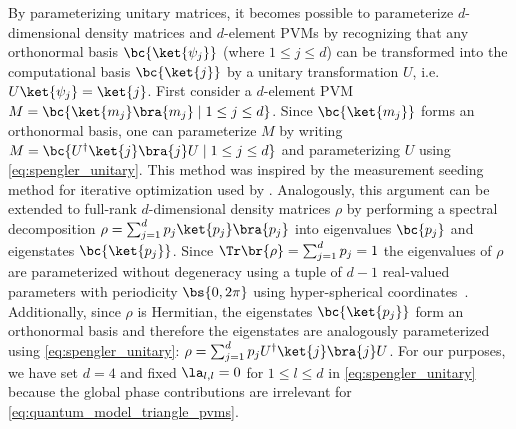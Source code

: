 \documentclass[aps, 10pt, english, twoside, pra, nofootinbib, tightenlines, longbibliography, superscriptaddress]{revtex4-1}
\begin{document}
    By parameterizing unitary matrices, it becomes possible to parameterize $d$-dimensional density matrices and $d$-element PVMs by recognizing that any orthonormal basis $\bc{\ket{\psi_j}}$ (where $1 \leq j \leq d$) can be transformed into the computational basis $\bc{\ket{j}}$ by a unitary transformation $U$, i.e. $U \ket{\psi_j} = \ket{j}$. First consider a $d$-element PVM $M = \bc{\ket{m_j}\bra{m_j} \mid 1 \leq j \leq d}$. Since $\bc{\ket{m_j}}$ forms an orthonormal basis, one can parameterize $M$ by writing $M = \bc{U^{\dagger}\ket{j}\bra{j}U \mid 1 \leq j \leq d}$ and parameterizing $U$ using \cref{eq:spengler_unitary}. This method was inspired by the measurement seeding method for iterative optimization used by \citet{Pal_2010}. Analogously, this argument can be extended to full-rank $d$-dimensional density matrices $\rho$ by performing a spectral decomposition $\rho = \sum_{j=1}^{d} p_j \ket{p_j} \bra{p_j}$ into eigenvalues $\bc{p_j}$ and eigenstates $\bc{\ket{p_j}}$. Since $\Tr\br{\rho} = \sum_{j = 1}^{d} p_j = 1$ the eigenvalues of $\rho$ are parameterized without degeneracy using a tuple of $d-1$ real-valued parameters with periodicity $\bs{0, 2 \pi}$ using hyper-spherical coordinates~\cite{Hedemann_2013, Spengler_2010_Unitary}. Additionally, since $\rho$ is Hermitian, the eigenstates $\bc{\ket{p_j}}$ form an orthonormal basis and therefore the eigenstates are analogously parameterized using \cref{eq:spengler_unitary}: $\rho = \sum_{j=1}^{d} p_j U^{\dagger} \ket{j} \bra{j} U$. For our purposes, we have set $d = 4$ and fixed $\la_{l, l} = 0$ for $1 \leq l \leq d$ in \cref{eq:spengler_unitary} because the global phase contributions are irrelevant for \cref{eq:quantum_model_triangle_pvms}.


\end{document}
